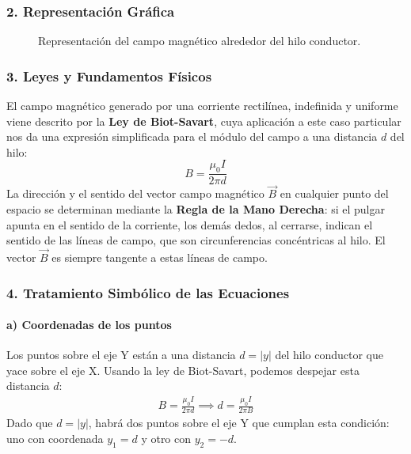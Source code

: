 \subsubsection*{2. Representación Gráfica}
\begin{figure}[H]
    \centering
    \caption{Representación del campo magnético alrededor del hilo conductor.}
\end{figure}

\subsubsection*{3. Leyes y Fundamentos Físicos}
El campo magnético generado por una corriente rectilínea, indefinida y uniforme viene descrito por la \textbf{Ley de Biot-Savart}, cuya aplicación a este caso particular nos da una expresión simplificada para el módulo del campo a una distancia $d$ del hilo:
$$ B = \frac{\mu_0 I}{2\pi d} $$
La dirección y el sentido del vector campo magnético $\vec{B}$ en cualquier punto del espacio se determinan mediante la \textbf{Regla de la Mano Derecha}: si el pulgar apunta en el sentido de la corriente, los demás dedos, al cerrarse, indican el sentido de las líneas de campo, que son circunferencias concéntricas al hilo. El vector $\vec{B}$ es siempre tangente a estas líneas de campo.

\subsubsection*{4. Tratamiento Simbólico de las Ecuaciones}
\paragraph*{a) Coordenadas de los puntos}
Los puntos sobre el eje Y están a una distancia $d = |y|$ del hilo conductor que yace sobre el eje X. Usando la ley de Biot-Savart, podemos despejar esta distancia $d$:
\begin{gather}
    B = \frac{\mu_0 I}{2\pi d} \implies d = \frac{\mu_0 I}{2\pi B}
\end{gather}
Dado que $d = |y|$, habrá dos puntos sobre el eje Y que cumplan esta condición: uno con coordenada $y_1 = d$ y otro con $y_2 = -d$.


